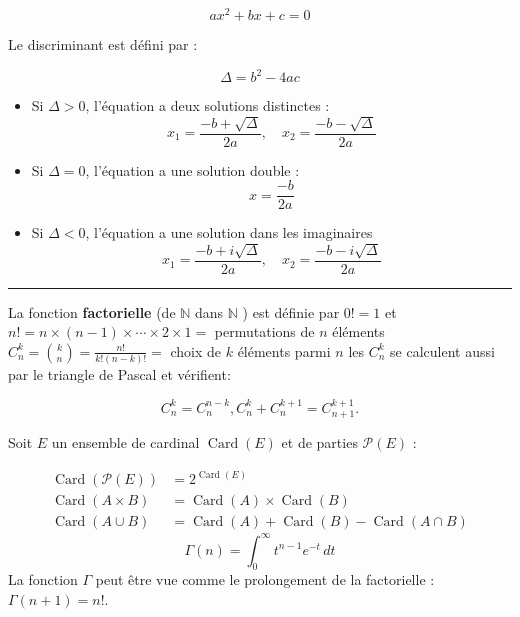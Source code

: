 \begin{f}  
     \[
    ax^2 + bx + c = 0
    \]

    Le discriminant est défini par :
    
    \[
    \Delta = b^2 - 4ac
    \]
       
    \begin{itemize}
        \item Si \(\Delta > 0\), l'équation a deux solutions distinctes :
        \[
        x_1 = \frac{-b + \sqrt{\Delta}}{2a}, \quad x_2 = \frac{-b - \sqrt{\Delta}}{2a}
        \]
        \item Si \(\Delta = 0\), l'équation a une solution double :
        \[
        x = \frac{-b}{2a}
        \]
        \item Si \(\Delta < 0\), l'équation a une solution dans les imaginaires
        \[
        x_1 = \frac{-b + i\sqrt{\Delta}}{2a}, \quad x_2 = \frac{-b - i\sqrt{\Delta}}{2a}
        \]
    \end{itemize}
\end{f}
\hrule
\begin{f}  

La fonction \textbf{factorielle} (de $\mathbb{N}$ dans $\mathbb{N}$ ) est définie par $0!=1$ et $n!=n \times(n-1) \times \cdots \times 2 \times 1=$ permutations de $n$ éléments $\displaystyle C_n^k=\binom{k}{n}=\frac{n!}{k!(n-k)!}=$ choix de $k$ éléments parmi $n$ les $C_n^k$ se calculent aussi par le triangle de Pascal et vérifient:

$$
C_n^k=C_n^{n-k}, C_n^k+C_n^{k+1}=C_{n+1}^{k+1} .
$$


Soit $E$ un ensemble de cardinal $\operatorname{Card}(E)$ et de parties $\mathcal{P}(E)$ :

$$
\begin{aligned}
\operatorname{Card}(\mathcal{P}(E)) & =2^{\operatorname{Card}(E)} \\
\operatorname{Card}(A \times B) & =\operatorname{Card}(A) \times \operatorname{Card}(B) \\
\operatorname{Card}(A \cup B) & =\operatorname{Card}(A)+\operatorname{Card}(B)-\operatorname{Card}(A \cap B)
\end{aligned}
$$
\[ \Gamma(n) = \int_0^\infty t^{n-1} e^{-t} \, dt \]
La fonction $\Gamma$ peut être vue comme le prolongement de la factorielle : $\Gamma(n+1)=n!$.
\end{f}

